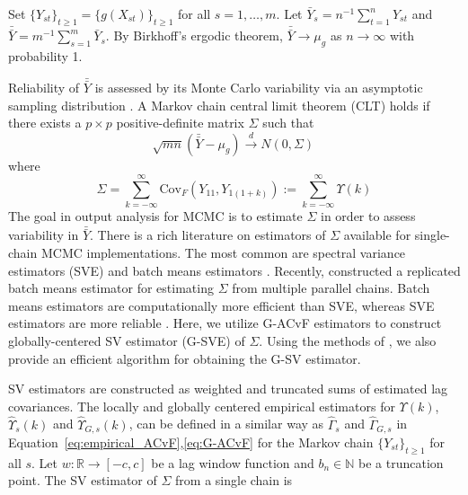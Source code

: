 \documentclass[11pt]{article}
\newcommand{\Cov}{\text{Cov}}
\theoremstyle{remark}
\begin{document}
Set $\{Y_{st}\}_{t \geq 1} = \{g(X_{st})\}_{t \geq 1}$ for all $s = 1, \dots, m$. Let $\bar{Y}_s = n^{-1}\sum_{t=1}^{n}Y_{st}$  and  $\bar{\bar{Y}} = m^{-1}\sum_{s=1}^{m}\bar{Y}_s$. By Birkhoff's ergodic theorem,  $\bar{\bar{Y}} \to \mu_g$ as $n \to \infty$ with probability 1.

Reliability of $\bar{\bar{Y}}$ is assessed by its Monte Carlo variability via an asymptotic sampling distribution \citep{fleg:hara:jone:2008,roy:2019,vats:rob:fle:jon:2020}. 
 A Markov chain central limit theorem (CLT) holds if there exists a $p \times p$ positive-definite matrix $\Sigma$ such that
%
\begin{equation}
\label{eq:CLT}
  \sqrt{mn}(\bar{\bar{Y}} - \mu_g) \xrightarrow{d} N(0,\Sigma)\,
\end{equation}
where
\begin{equation}
\label{eq:sigma}
  \Sigma = \sum_{k = -\infty}^{\infty} \Cov_F \left( Y_{11}, Y_{1(1+k)} \right) := \sum_{k = -\infty}^{\infty}\Upsilon (k)
\end{equation}
%
The goal in output analysis for MCMC is to estimate $\Sigma$ in order to assess variability in $\bar{\bar{Y}}$. There is a rich literature on estimators of $\Sigma$ available for single-chain MCMC implementations. The most common are spectral variance estimators (SVE) \citep{andr:1991,vats:fleg:jon:2018} and batch means estimators \citep{chen:seila:1987,vats:fleg:jon:2019}. Recently, \cite{gupta:vats:2020} constructed a replicated batch means estimator for estimating $\Sigma$ from multiple parallel chains. Batch means estimators are computationally more efficient than SVE, whereas SVE estimators are more reliable \citep{fleg:jone:2010}. Here, we utilize G-ACvF estimators to construct globally-centered SV estimator (G-SVE) of $\Sigma$. Using the methods of \cite{heberle2017fast}, we also provide an efficient algorithm for obtaining the G-SV estimator. 

SV estimators are constructed as weighted and truncated sums of estimated lag covariances. The locally and globally centered empirical estimators for $\Upsilon(k)$, $\hat{\Upsilon}_s(k)$ and $\hat{\Upsilon}_{G,s}(k)$, can be defined in a similar way as $\hat{\Gamma}_s$ and $\hat{\Gamma}_{G,s}$ in Equation~\ref{eq:empirical_ACvF},\ref{eq:G-ACvF} for the Markov chain $\{Y_{st}\}_{t \geq 1}$ for all $s$. Let $w: \mathbb{R} \to [-c,c]$ be a lag window function and $b_n \in \mathbb{N}$ be a truncation point. The SV estimator of $\Sigma$ from a single chain is
%
\end{document}
